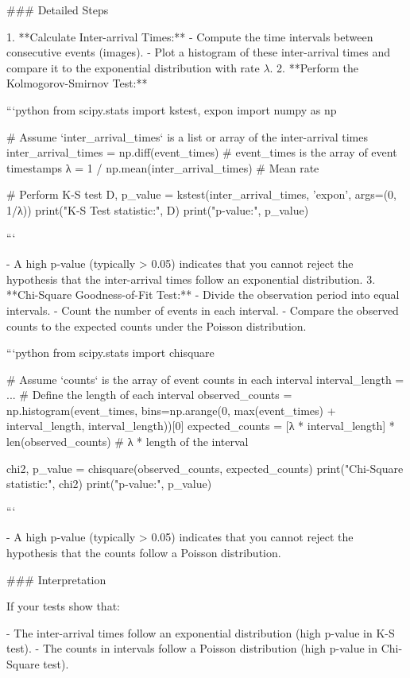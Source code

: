 ### Detailed Steps

1. **Calculate Inter-arrival Times:**
    - Compute the time intervals between consecutive events (images).
    - Plot a histogram of these inter-arrival times and compare it to the exponential distribution with rate \( λ \).
2. **Perform the Kolmogorov-Smirnov Test:**
    
    ```python
    from scipy.stats import kstest, expon
    import numpy as np
    
    # Assume `inter_arrival_times` is a list or array of the inter-arrival times
    inter_arrival_times = np.diff(event_times)  # event_times is the array of event timestamps
    λ = 1 / np.mean(inter_arrival_times)  # Mean rate
    
    # Perform K-S test
    D, p_value = kstest(inter_arrival_times, 'expon', args=(0, 1/λ))
    print("K-S Test statistic:", D)
    print("p-value:", p_value)
    
    ```
    
    - A high p-value (typically > 0.05) indicates that you cannot reject the hypothesis that the inter-arrival times follow an exponential distribution.
3. **Chi-Square Goodness-of-Fit Test:**
    - Divide the observation period into equal intervals.
    - Count the number of events in each interval.
    - Compare the observed counts to the expected counts under the Poisson distribution.
    
    ```python
    from scipy.stats import chisquare
    
    # Assume `counts` is the array of event counts in each interval
    interval_length = ...  # Define the length of each interval
    observed_counts = np.histogram(event_times, bins=np.arange(0, max(event_times) + interval_length, interval_length))[0]
    expected_counts = [λ * interval_length] * len(observed_counts)  # λ * length of the interval
    
    chi2, p_value = chisquare(observed_counts, expected_counts)
    print("Chi-Square statistic:", chi2)
    print("p-value:", p_value)
    
    ```
    
    - A high p-value (typically > 0.05) indicates that you cannot reject the hypothesis that the counts follow a Poisson distribution.

### Interpretation

If your tests show that:

- The inter-arrival times follow an exponential distribution (high p-value in K-S test).
- The counts in intervals follow a Poisson distribution (high p-value in Chi-Square test).

